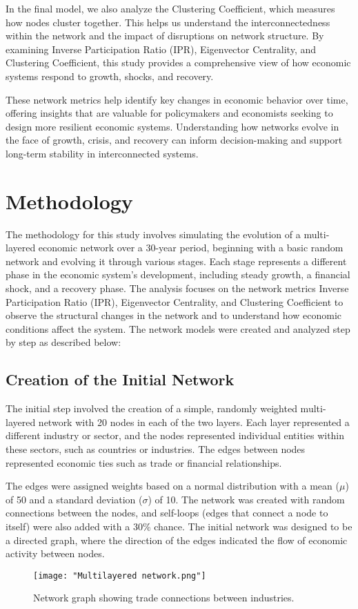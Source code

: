 \documentclass{article} %
\begin{document}
In the final model, we also analyze the Clustering Coefficient, which measures how nodes cluster together. This helps us understand the interconnectedness within the network and the impact of disruptions on network structure. By examining Inverse Participation Ratio (IPR), Eigenvector Centrality, and Clustering Coefficient, this study provides a comprehensive view of how economic systems respond to growth, shocks, and recovery.

These network metrics help identify key changes in economic behavior over time, offering insights that are valuable for policymakers and economists seeking to design more resilient economic systems. Understanding how networks evolve in the face of growth, crisis, and recovery can inform decision-making and support long-term stability in interconnected systems.



\section{Methodology}
The methodology for this study involves simulating the evolution of a multi-layered economic network over a 30-year period, beginning with a basic random network and evolving it through various stages. Each stage represents a different phase in the economic system's development, including steady growth, a financial shock, and a recovery phase. The analysis focuses on the network metrics Inverse Participation Ratio (IPR), Eigenvector Centrality, and Clustering Coefficient to observe the structural changes in the network and to understand how economic conditions affect the system. The network models were created and analyzed step by step as described below:


\subsection{Creation of the Initial Network}
The initial step involved the creation of a simple, randomly weighted multi-layered network with 20 nodes in each of the two layers. Each layer represented a different industry or sector, and the nodes represented individual entities within these sectors, such as countries or industries. The edges between nodes represented economic ties such as trade or financial relationships.

The edges were assigned weights based on a normal distribution with a mean (\(\mu\)) of 50 and a standard deviation (\(\sigma\)) of 10. The network was created with random connections between the nodes, and self-loops (edges that connect a node to itself) were also added with a 30\% chance. The initial network was designed to be a directed graph, where the direction of the edges indicated the flow of economic activity between nodes.
\begin{figure}[h]
\begin{center}
    \texttt{[image: "Multilayered network.png"]}
\end{center}
\caption{Network graph showing trade connections between industries.}
\end{figure}
\end{document}
